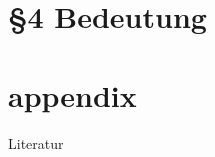 \documentclass[]{beamer}%
\begin{document}
\section{§4 Bedeutung}
\begin{frame}
\end{frame}

\appendix
\section{appendix}
\begin{frame}
\end{frame}

\begin{frame}{Literatur}
    
    
\end{frame}
\end{document}
